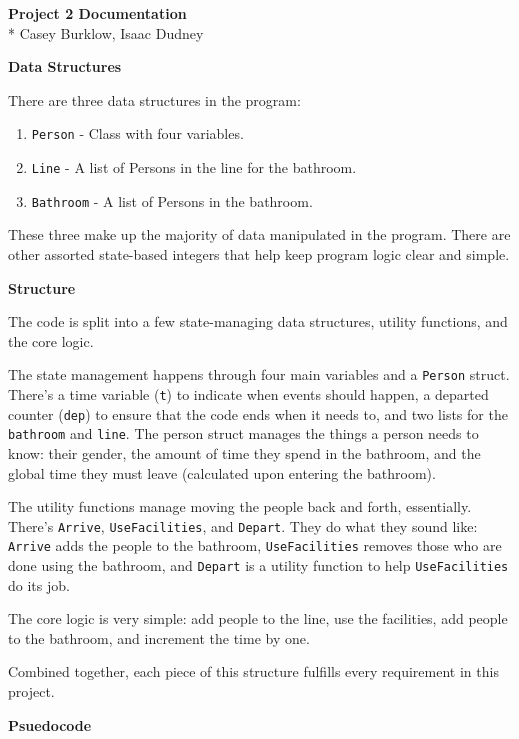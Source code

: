 \documentclass[11pt]{article}
\begin{document}
\noindent
{\Large \textbf{Project 2 Documentation}}\\*
Casey Burklow, Isaac Dudney

\noindent
\textbf{Data Structures}

There are three data structures in the program:

\begin{enumerate}
\item \texttt{Person} - Class with four variables.
\item \texttt{Line} - A list of Persons in the line for the bathroom.
\item \texttt{Bathroom} - A list of Persons in the bathroom.
\end{enumerate}

These three make up the majority of data manipulated in the program.
There are other assorted state-based integers that help keep program logic clear and simple.

\noindent
\textbf{Structure}

The code is split into a few state-managing data structures, utility functions, and the core logic.

The state management happens through four main variables and a \texttt{Person} struct.
There's a time variable (\texttt{t}) to indicate when events should happen, a departed counter (\texttt{dep}) to ensure that the code ends when it needs to, and two lists for the \texttt{bathroom} and \texttt{line}.
The person struct manages the things a person needs to know: their gender, the amount of time they spend in the bathroom, and the global time they must leave (calculated upon entering the bathroom).

The utility functions manage moving the people back and forth, essentially. There's \texttt{Arrive}, \texttt{UseFacilities}, and \texttt{Depart}.
They do what they sound like: \texttt{Arrive} adds the people to the bathroom, \texttt{UseFacilities} removes those who are done using the bathroom, and \texttt{Depart} is a utility function to help \texttt{UseFacilities} do its job.

The core logic is very simple: add people to the line, use the facilities, add people to the bathroom, and increment the time by one.

Combined together, each piece of this structure fulfills every requirement in this project.

\newpage

\noindent
\textbf{Psuedocode}
\end{document}
